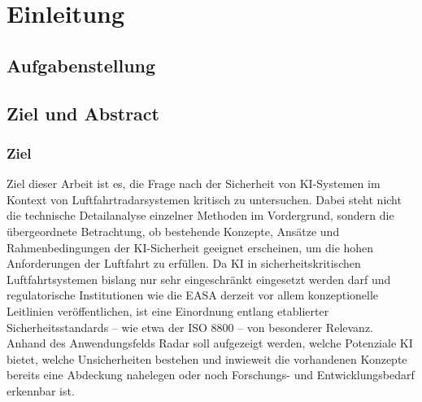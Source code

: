 
\part{Einleitung}

\chapter{Aufgabenstellung}




\chapter{Ziel und Abstract}

\section{Ziel}
Ziel dieser Arbeit ist es, die Frage nach der Sicherheit von KI-Systemen im Kontext von 
Luftfahrtradarsystemen kritisch zu untersuchen. Dabei steht nicht die technische Detailanalyse 
einzelner Methoden im Vordergrund, sondern die übergeordnete Betrachtung, ob bestehende 
Konzepte, Ansätze und Rahmenbedingungen der KI-Sicherheit geeignet erscheinen, um die 
hohen Anforderungen der Luftfahrt zu erfüllen. Da KI in sicherheitskritischen 
Luftfahrtsystemen bislang nur sehr eingeschränkt eingesetzt werden darf und regulatorische 
Institutionen wie die EASA derzeit vor allem konzeptionelle Leitlinien veröffentlichen, 
ist eine Einordnung entlang etablierter Sicherheitsstandards – wie etwa der ISO 8800 – 
von besonderer Relevanz. Anhand des Anwendungsfelds Radar soll aufgezeigt werden, welche 
Potenziale KI bietet, welche Unsicherheiten bestehen und inwieweit die vorhandenen Konzepte 
bereits eine Abdeckung nahelegen oder noch Forschungs- und Entwicklungsbedarf erkennbar ist.

